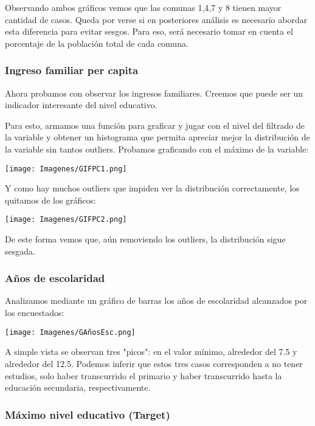 \documentclass[a4paper]{article}
\begin{document}
            Observando ambos gráficos vemos que las comunas 1,4,7 y 8 tienen mayor cantidad de casos. Queda por verse si en posteriores análisis es necesario abordar esta diferencia para evitar sesgos. Para eso, será necesario tomar en cuenta el porcentaje de la población total de cada comuna.
        
        \subsubsection{Ingreso familiar per capita}
        
            Ahora probamos con observar los ingresos familiares. Creemos que puede ser un indicador interesante del nivel educativo.
        
            Para esto, armamos una función para graficar y jugar con el nivel del filtrado de la variable y obtener un histograma que permita apreciar mejor la distribución de la variable sin tantos outliers. Probamos graficando con el máximo de la variable:
        
            \texttt{[image: Imagenes/GIFPC1.png]}
        
            Y como hay muchos outliers que impiden ver la distribución correctamente, los quitamos de los gráficos:
        
            \texttt{[image: Imagenes/GIFPC2.png]}

            De este forma vemos que, aún removiendo los outliers, la distribución sigue sesgada.

        \newpage    

        \subsubsection{Años de escolaridad}
        
            Analizamos mediante un gráfico de barras los años de escolaridad alcanzados por los encuestados:
            
            \texttt{[image: Imagenes/GAñosEsc.png]}
            
            A simple vista se observan tres "picos": en el valor mínimo, alrededor del 7.5 y alrededor del 12.5. Podemos inferir que estos tres casos corresponden a no tener estudios, solo haber transcurrido el primario y haber transcurrido hasta la educación secundaria, respectivamente.
        
        \subsubsection{Máximo nivel educativo (Target)}
        
\end{document}
